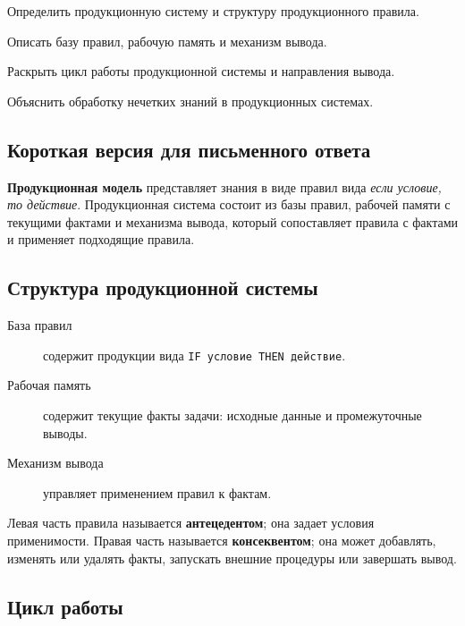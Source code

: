 
\begin{examplan}
    \item Определить продукционную систему и структуру продукционного правила.
    \item Описать базу правил, рабочую память и механизм вывода.
    \item Раскрыть цикл работы продукционной системы и направления вывода.
    \item Объяснить обработку нечетких знаний в продукционных системах.
\end{examplan}

\subsection*{Короткая версия для письменного ответа}

\textbf{Продукционная модель} представляет знания в виде правил вида \textit{если условие, то действие}. Продукционная система состоит из базы правил, рабочей памяти с текущими фактами и механизма вывода, который сопоставляет правила с фактами и применяет подходящие правила.

\subsection*{Структура продукционной системы}

\begin{description}
    \item[База правил] содержит продукции вида \texttt{IF условие THEN действие}.
    \item[Рабочая память] содержит текущие факты задачи: исходные данные и промежуточные выводы.
    \item[Механизм вывода] управляет применением правил к фактам.
\end{description}

Левая часть правила называется \textbf{антецедентом}; она задает условия применимости. Правая часть называется \textbf{консеквентом}; она может добавлять, изменять или удалять факты, запускать внешние процедуры или завершать вывод.

\subsection*{Цикл работы}

